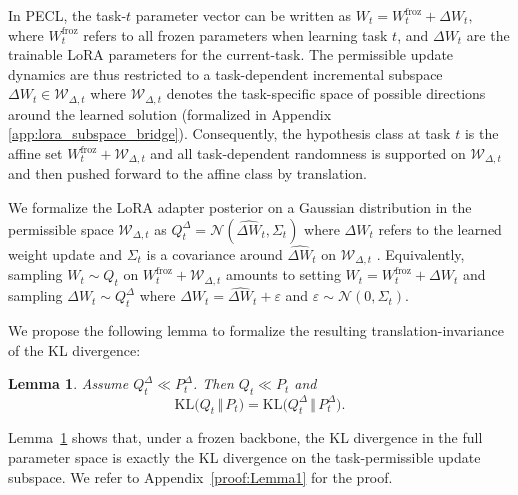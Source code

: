 \documentclass{article}
\theoremstyle{plain}
\newtheorem{lemma}[theorem]{Lemma}
\theoremstyle{definition}
\theoremstyle{remark}
\begin{document}
In PECL, the task-$t$ parameter vector can be written as
$
W_t = W^{\mathrm{froz}}_t + \Delta W_t,
$
where $W^{\mathrm{froz}}_t$ refers to
all frozen parameters when learning task $t$, and $\Delta W_t$ are the trainable LoRA parameters for the current-task. The permissible update dynamics are thus restricted to a task-dependent incremental subspace
$
\Delta W_t \in \mathcal W_{\Delta,t}
$
where $\mathcal W_{\Delta,t}$ denotes the task-specific space of possible directions around the learned
solution (formalized in Appendix \ref{app:lora_subspace_bridge}). Consequently, the hypothesis class at task $t$ is the affine
set $W^{\mathrm{froz}}_t + \mathcal W_{\Delta,t}$ and all task-dependent randomness is supported
on $\mathcal W_{\Delta,t}$ and then pushed forward to the affine class by translation. 


We formalize the LoRA adapter posterior on a Gaussian distribution in the permissible space $\mathcal W_{\Delta,t}$ as
$
Q_t^\Delta = \mathcal N(\widehat{\Delta W}_t,\Sigma_t)$ where
$\widehat{\Delta W}_t$ refers to the learned weight update 
and $\Sigma_t$ is a covariance around $\widehat{\Delta W}_t$ on $\mathcal W_{\Delta,t}$ .
Equivalently, sampling $W_t\sim Q_t$ on $W^{\mathrm{froz}}_t+\mathcal W_{\Delta,t}$ amounts to 
setting $W_t=W^{\mathrm{froz}}_t+\Delta W_t$ and sampling $ \Delta W_t \sim Q_t^{\Delta}$ where $\Delta W_t = \widehat{\Delta W}_t + \varepsilon$
and
$
\varepsilon \sim \mathcal N(0,\Sigma_t).$




We propose the following lemma to formalize the resulting translation-invariance of the KL divergence:
\begin{lemma}
\label{lem:kl-decomp-pecl}
Assume $Q_t^\Delta \ll P_t^\Delta$. Then $Q_t \ll P_t$ and
\[
\mathrm{KL}\bigl(Q_t \,\Vert\, P_t\bigr)
=
\mathrm{KL}\bigl(Q_t^\Delta \,\Vert\, P_t^\Delta\bigr).
\]
\end{lemma}
Lemma~\ref{lem:kl-decomp-pecl} shows that, under a frozen backbone, the  KL divergence in the full parameter space is exactly the KL divergence on the task-permissible update subspace. We refer to Appendix~\ref{proof:Lemma1} for the proof.
\end{document}
